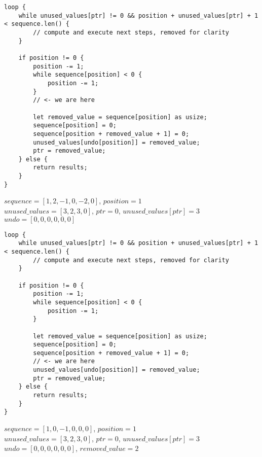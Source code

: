 \begin{frame}[fragile]
    \begin{verbatim}
loop {
    while unused_values[ptr] != 0 && position + unused_values[ptr] + 1 < sequence.len() {
        // compute and execute next steps, removed for clarity
    }
    
    if position != 0 {
        position -= 1;
        while sequence[position] < 0 {
            position -= 1;
        }
        // <- we are here

        let removed_value = sequence[position] as usize;
        sequence[position] = 0;
        sequence[position + removed_value + 1] = 0;
        unused_values[undo[position]] = removed_value;
        ptr = removed_value;
    } else {
        return results;
    }
}
    \end{verbatim}
    $sequence = [1, 2, -1, 0, -2, 0]$, $position = 1$\\
    $unused\_values = [3, 2, 3, 0]$, $ptr = 0$, $unused\_values[ptr] = 3$\\
    $undo = [0, 0, 0, 0, 0, 0]$
\end{frame}
\begin{frame}[fragile]
    \begin{verbatim}
loop {
    while unused_values[ptr] != 0 && position + unused_values[ptr] + 1 < sequence.len() {
        // compute and execute next steps, removed for clarity
    }
    
    if position != 0 {
        position -= 1;
        while sequence[position] < 0 {
            position -= 1;
        }
        
        let removed_value = sequence[position] as usize;
        sequence[position] = 0;
        sequence[position + removed_value + 1] = 0;
        // <- we are here
        unused_values[undo[position]] = removed_value;
        ptr = removed_value;
    } else {
        return results;
    }
}
    \end{verbatim}
    $sequence = [1, 0, -1, 0, 0, 0]$, $position = 1$\\
    $unused\_values = [3, 2, 3, 0]$, $ptr = 0$, $unused\_values[ptr] = 3$\\
    $undo = [0, 0, 0, 0, 0, 0]$, $removed\_value = 2$
\end{frame}
